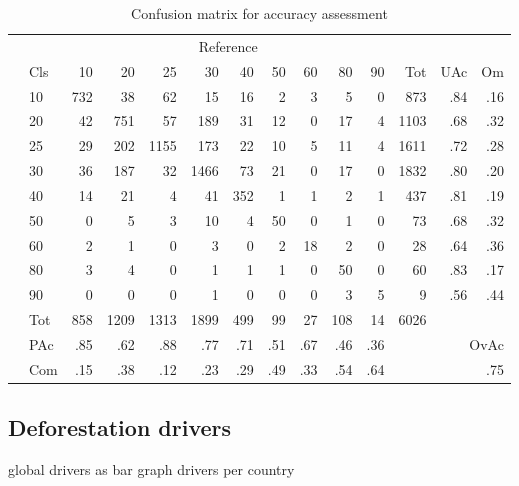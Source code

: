 	    \begin{table}[ht]
		    \centering
		    \caption[Accuracy assessment]{Confusion matrix for accuracy assessment}
		    \label{tab:accuracy}
		    \begin{tabular}{ll|rrrrrrrrr|rrr}
			    & & \multicolumn{9}{c|}{Reference} & & & \\
			    & Cls & 10 & 20 & 25 & 30 & 40 & 50 & 60 & 80 & 90 & Tot & UAc & Om \\\hline
			    \multirow{9}{*}{\STAB{\rotatebox[origin=c]{90}{Prediction}}}
			    & 10 & 732 & 38 & 62 & 15 & 16 & 2 & 3 & 5 & 0 & 873 & .84 & .16 \\ 
			    & 20 & 42 & 751 & 57 & 189 & 31 & 12 & 0 & 17 & 4 & 1103 & .68 & .32 \\ 
			    & 25 & 29 & 202 & 1155 & 173 & 22 & 10 & 5 & 11 & 4 & 1611 & .72 & .28 \\ 
			    & 30 & 36 & 187 & 32 & 1466 & 73 & 21 & 0 & 17 & 0 & 1832 & .80 & .20 \\ 
			    & 40 & 14 & 21 & 4 & 41 & 352 & 1 & 1 & 2 & 1 & 437 & .81 & .19 \\ 
			    & 50 & 0 & 5 & 3 & 10 & 4 & 50 & 0 & 1 & 0 & 73 & .68 & .32 \\ 
			    & 60 & 2 & 1 & 0 & 3 & 0 & 2 & 18 & 2 & 0 & 28 & .64 & .36 \\ 
			    & 80 & 3 & 4 & 0 & 1 & 1 & 1 & 0 & 50 & 0 & 60 & .83 & .17 \\ 
			    & 90 & 0 & 0 & 0 & 1 & 0 & 0 & 0 & 3 & 5 & 9 & .56 & .44 \\\hline 
			    & Tot & 858 & 1209 & 1313 & 1899 & 499 & 99 & 27 & 108 & 14 & 6026 & & \\
			    & PAc & .85 & .62 & .88 & .77 & .71 & .51 & .67 & .46 & .36 & & \multicolumn{2}{r}{OvAc} \\
			    & Com & .15 & .38 & .12 & .23 & .29 & .49 & .33 & .54 & .64 & & \multicolumn{2}{r}{.75} \\ 
		    \end{tabular}
	    \end{table}

\newpage

    \subsection{Deforestation drivers}
    \label{subsec:driver}
		{\color{red} global drivers as bar graph}
		{\color{red} drivers per country}

